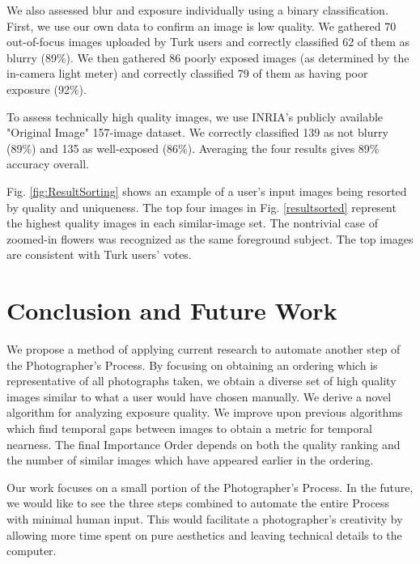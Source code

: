 \documentclass{sig-alternate}
\begin{document}
We also assessed blur and exposure individually using a binary classification. First, we use our own data to confirm an image is low quality. We gathered 70 out-of-focus images uploaded by Turk users and correctly classified 62 of them as blurry (89\%). We then gathered 86 poorly exposed images (as determined by the in-camera light meter) and correctly classified 79 of them as having poor exposure (92\%).

To assess technically high quality images, we use INRIA's publicly available "Original Image" 157-image dataset\cite{JDS08}.  We correctly classified 139 as not blurry (89\%) and 135 as well-exposed (86\%). Averaging the four results gives 89\% accuracy overall.

Fig. \ref{fig:ResultSorting} shows an example of a user's input images being resorted by quality and uniqueness. The top four images in Fig. \ref{resultsorted} represent the highest quality images in each similar-image set. The nontrivial case of zoomed-in flowers was recognized as the same foreground subject. The top images are consistent with Turk users' votes.


\section{Conclusion and Future Work}
We propose a method of applying current research to automate another step of the Photographer's Process. By focusing on obtaining an ordering which is representative of all photographs taken, we obtain a diverse set of high quality images similar to what a user would have chosen manually. We derive a novel algorithm for analyzing exposure quality. We improve upon previous algorithms which find temporal gaps between images to obtain a metric for temporal nearness. The final Importance Order depends on both the quality ranking and the number of similar images which have appeared earlier in the ordering.

Our work focuses on a small portion of the Photographer's Process. In the future, we would like to see the three steps combined to automate the entire Process with minimal human input. This would facilitate a photographer's creativity by allowing more time spent on pure aesthetics and leaving technical details to the computer.

{
 
 
}
\end{document}
